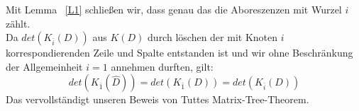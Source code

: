 Mit Lemma ~\ref{L1} schließen wir, dass genau das die Aboreszenzen mit Wurzel $i$ zählt.\\
Da $det(K_{\bar{i}}(D))$ aus $K(D)$ durch löschen der mit Knoten $i$ korrespondierenden Zeile und Spalte entstanden ist und wir ohne Beschränkung der Allgemeinheit $i=1$ annehmen durften, gilt:
\begin{equation}
 det(K_{\bar{1}}(\hat{D}))=det(K_{\bar{1}}(D))=det(K_{\bar{i}}(D))
\end{equation}
Das vervollständigt unseren Beweis von Tuttes Matrix-Tree-Theorem.

